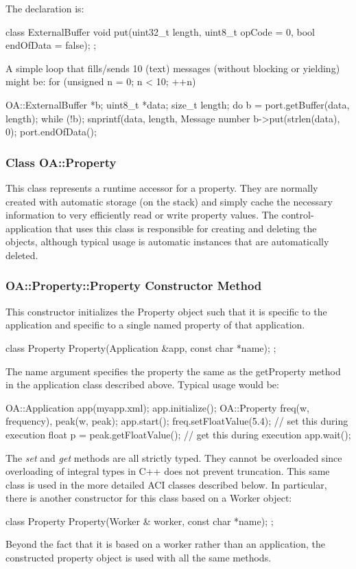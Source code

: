 \documentclass[10pt, a4paper, oneside]{article}
\renewcommand\_{\textunderscore\allowbreak} %
\begin{document}
The declaration is: 
\begin{ocpixml}  
	class ExternalBuffer {
		void put(uint32_t length,
		uint8_t opCode = 0, 
		bool endOfData = false);
  };\end{ocpixml} 
A simple loop that fills/sends 10 (text) messages (without blocking or yielding) might be:
  for (unsigned n = 0; n < 10; ++n) 
\begin{ocpixml}  
{
   OA::ExternalBuffer *b;
    uint8_t *data;  size_t length;
    do b = port.getBuffer(data, length); while (!b);
    snprintf(data, length, Message number %
    b->put(strlen(data), 0);
  }
  port.endOfData();  \end{ocpixml} 
\subsubsection{Class OA::Property} This class represents a runtime accessor for a property.  They are normally created with automatic storage (on the stack) and simply cache the necessary information to very efficiently read or write property values.  The control-application that uses this class is responsible for creating and deleting the objects, although typical usage is automatic instances that are automatically deleted.
\subsubsection{OA::Property::Property Constructor Method} This constructor initializes the Property object such that it is specific to the application and specific to a single named property of that application.  
\begin{ocpixml}  
  class Property {
  Property(Application &app, const char *name);
  }; \end{ocpixml} 

The name argument specifies the property the same as the getProperty method in the application class described above.  Typical usage would be:
\begin{ocpixml}  
  {
    OA::Application app(myapp.xml);
    app.initialize();
    OA::Property freq(w, frequency), peak(w, peak);
    app.start();
    freq.setFloatValue(5.4);        // set this during execution
    float p = peak.getFloatValue(); // get this during execution
    app.wait();
  }\end{ocpixml} 
The \emph{set} and \emph{get} methods are all strictly typed.  They cannot be overloaded since overloading of integral types in C++ does not prevent truncation.
This same class is used in the more detailed ACI classes described below. In particular, there is another constructor for this class based on a Worker object:  \begin{ocpixml}  
class Property {
    Property(Worker & worker, const char *name);
  };\end{ocpixml} 
Beyond the fact that it is based on a worker rather than an application, the constructed property object is used with all the same methods.
\end{document}
